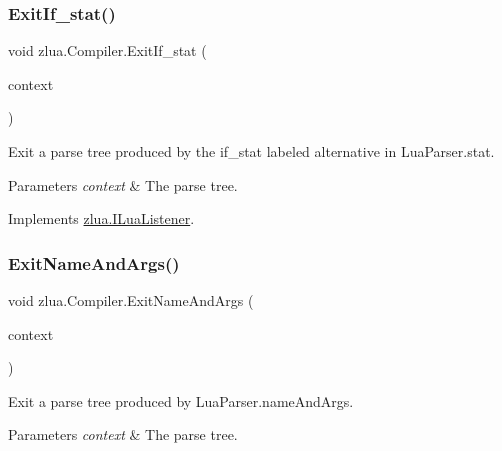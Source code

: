 \subsubsection{\texorpdfstring{Exit\+If\+\_\+stat()}{ExitIf\_stat()}}
{\footnotesize\ttfamily void zlua.\+Compiler.\+Exit\+If\+\_\+stat (\begin{DoxyParamCaption}\item[{\mbox{[}\+Not\+Null\mbox{]} \mbox{\hyperlink{classzlua_1_1_lua_parser_1_1_if__stat_context}{Lua\+Parser.\+If\+\_\+stat\+Context}}}]{context }\end{DoxyParamCaption})}



Exit a parse tree produced by the {\ttfamily if\+\_\+stat} labeled alternative in Lua\+Parser.\+stat. 


\begin{DoxyParams}{Parameters}
{\em context} & The parse tree.\\
\hline
\end{DoxyParams}


Implements \mbox{\hyperlink{interfacezlua_1_1_i_lua_listener_a2f0389129d1846cafed21b068ecdb15d}{zlua.\+I\+Lua\+Listener}}.

\mbox{\label{classzlua_1_1_compiler_afa2dba6f3e7fb7b060741a58bdac97f4}} 
\subsubsection{\texorpdfstring{Exit\+Name\+And\+Args()}{ExitNameAndArgs()}}
{\footnotesize\ttfamily void zlua.\+Compiler.\+Exit\+Name\+And\+Args (\begin{DoxyParamCaption}\item[{\mbox{[}\+Not\+Null\mbox{]} \mbox{\hyperlink{classzlua_1_1_lua_parser_1_1_name_and_args_context}{Lua\+Parser.\+Name\+And\+Args\+Context}}}]{context }\end{DoxyParamCaption})}



Exit a parse tree produced by Lua\+Parser.\+name\+And\+Args. 


\begin{DoxyParams}{Parameters}
{\em context} & The parse tree.\\
\hline
\end{DoxyParams}


